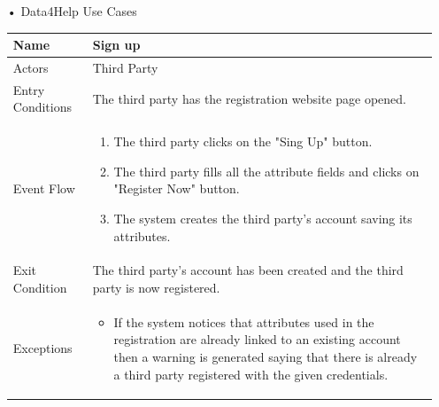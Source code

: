 \begin{enumerate}

\FloatBarrier
\item[•]{\Large Data4Help Use Cases}

\begin{table}[h]
\begin{tabular}{|l|l|}
\hline
Name             & Sign up \\ \hline
Actors           & Third Party  \\ \hline
Entry Conditions & The third party has the registration website page opened.    \\ \hline
Event Flow       & \parbox{.45\textwidth}{\begin{enumerate}
            \item The third party clicks on the "Sing Up" button.
            \item The third party fills all the attribute fields and clicks on "Register Now" button.
            \item The system creates the third party's account saving its attributes.
        \end{enumerate}}\\ \hline
Exit Condition   & The third party's account has been created and the third party is now registered.\\ \hline
Exceptions       & \parbox{.45\textwidth}  
{\begin{itemize}
\item If the system notices that attributes used in the registration are already linked to an existing account then a warning is generated saying that there is already a third party registered with the given credentials.
\end{itemize}}\\ \hline
\end{tabular}
\end{table}
\FloatBarrier


\end{enumerate}

